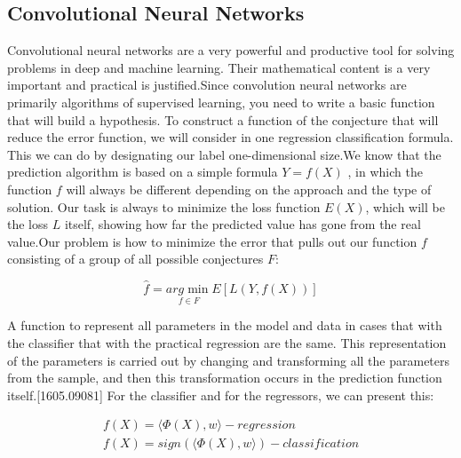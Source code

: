 \subsection{Convolutional Neural Networks}\label{sec:3.8.1}
\vspace{-0.5cm}
\noindent Convolutional neural networks are a very powerful and productive tool for solving problems in deep and machine learning. Their mathematical content is a very important and practical is justified.Since convolution neural networks are primarily algorithms of supervised learning, you need to write a basic function that will build a hypothesis. To construct a function of the conjecture that will reduce the error function, we will consider in one regression classification formula. This we can do by designating our label one-dimensional size.We know that the prediction algorithm is based on a simple formula $ Y = f(X)$ , in which the function $f$ will always be different depending on the approach and the type of solution. Our task is always to minimize the loss function $E(X)$, which will be the loss $L$ itself, showing how far the predicted value has gone from the real value.Our problem is how to minimize the error that pulls out our function $f$ consisting of a group of all possible conjectures $F$:


\begin{equation}
	\hat{f} = \underset{f\in F}{arg\min}E[L(Y,f(X))]
\end{equation}

\noindent A function to represent all parameters in the model and data in cases that with the classifier that with the practical regression are the same. This representation of the parameters is carried out by changing and transforming all the parameters from the sample, and then this transformation occurs in the prediction function itself.[1605.09081]  For the classifier and for the regressors, we can present this:

\begin{equation}
	\begin{split}
		f(X) = \langle \Phi(X), w\rangle - regression \\
		f(X) = sign(\langle \Phi(X), w\rangle) -  classification
	\end{split}
\end{equation}

